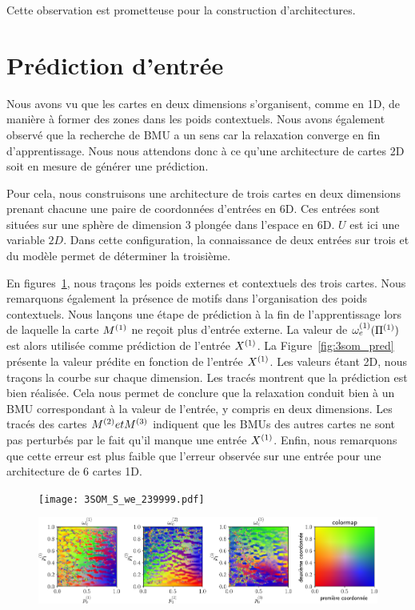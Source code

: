 \documentclass[../main]{subfiles}
\begin{document}
Cette observation est prometteuse pour la construction d'architectures.

\section{Prédiction d'entrée}

Nous avons vu que les cartes en deux dimensions s'organisent, comme en 1D, de manière à former des zones dans les poids contextuels. Nous avons également observé que la recherche de BMU a un sens car la relaxation converge en fin d'apprentissage.
Nous nous attendons donc à ce qu'une architecture de cartes 2D soit en mesure de générer une prédiction.

Pour cela, nous construisons une architecture de trois cartes en deux dimensions prenant chacune une paire de coordonnées d'entrées en 6D. Ces entrées sont situées sur une sphère de dimension 3 plongée dans l'espace en 6D. $U$ est ici une variable $2D$. Dans cette configuration, la connaissance de deux entrées sur trois et du modèle permet de déterminer la troisième.

En figures~\ref{fig:3som_w}, nous traçons les poids externes et contextuels des trois cartes.
Nous remarquons également la présence de motifs dans l'organisation des poids contextuels.
Nous lançons une étape de prédiction à la fin de l'apprentissage lors de laquelle la carte $M^{({1})}$ ne reçoit plus d'entrée externe. La valeur de $\omega_{e}^{({1})}(\Pi^{({1})})$ est alors utilisée comme prédiction de l'entrée $X^{({1})}$.
La Figure~\ref{fig:3som_pred} présente la valeur prédite en fonction de l'entrée $X^{({1})}$. Les valeurs étant 2D, nous traçons la courbe sur chaque dimension. 
Les tracés montrent que la prédiction est bien réalisée. Cela nous permet de conclure que la relaxation conduit bien à un BMU correspondant à la valeur de l'entrée, y compris en deux dimensions. Les tracés des cartes $M^{({2})} et M^{({3})}$ indiquent que les BMUs des autres cartes ne sont pas perturbés par le fait qu'il manque une entrée $X^{({1})}$.
Enfin, nous remarquons que cette erreur est plus faible que l'erreur observée sur une entrée  pour une architecture de 6 cartes 1D.

\begin{figure}
	\begin{minipage}{\textwidth}
		\centering\texttt{[image: 3SOM\_S\_we\_239999.pdf]}
	\end{minipage}
	\begin{minipage}{\textwidth}
		\includegraphics[width=\textwidth]{3SOM_S_wc_239999.pdf}
		\caption{\label{fig:3som_w}}
	\end{minipage}
\end{figure}
\end{document}
